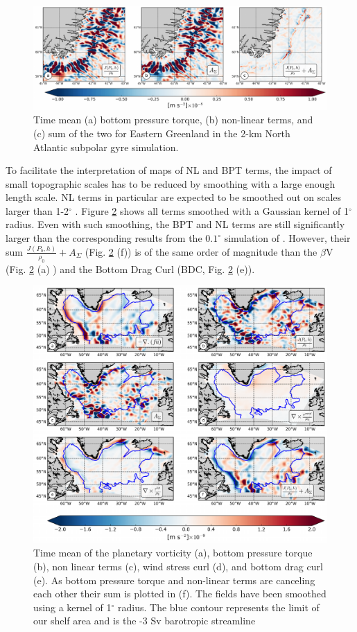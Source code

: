 \documentclass[os, manuscript]{copernicus}
\begin{document}
\begin{figure}[t]
\includegraphics[width=15cm]{../fig_os/f06.pdf}
\caption{Time mean (a) bottom pressure torque, (b) non-linear terms, and (c) sum of the two for Eastern Greenland in the 2-km North Atlantic subpolar gyre simulation.}
\label{f06}
\end{figure} 

To facilitate the interpretation of maps of NL and BPT terms, the impact of small topographic scales has to be reduced by smoothing with a large enough length scale. 
NL terms in particular are expected to be smoothed out on scales larger than 1-2$^{\circ}$ \citep{hughes2001}. Figure \ref{f07} shows all terms smoothed with a Gaussian kernel of 1$^{\circ}$ radius. Even with such smoothing, the BPT and NL terms are still significantly larger than the corresponding results from the $0.1^{\circ}$ simulation of \citet{yeager2015}. However, their sum $\frac{J(P_b,h)}{\rho _0}+A_{\Sigma}$ (Fig. \ref{f07} (f)) is of the same order of magnitude than the $\beta$V (Fig. \ref{f07} (a) ) and the Bottom Drag Curl (BDC, Fig. \ref{f07} (e)). 

\begin{figure}[t]
\includegraphics[width=15cm]{../fig_os/f07.pdf}
\caption{ Time mean of the planetary vorticity (a), bottom pressure torque (b), non linear terms (c), wind stress curl (d), and bottom drag curl (e). As bottom pressure torque and non-linear terms are canceling each other their sum is plotted in (f). The fields have been smoothed using a kernel of 1$^{\circ}$ radius. The blue contour represents the limit of our shelf area and is the -3 Sv barotropic streamline}
\label{f07}
\end{figure} 
\end{document}
